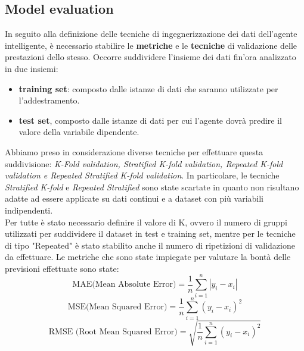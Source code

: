 \subsection{Model evaluation}
\fancyhead{}    %
\label{paragrafo 4.1}
In seguito alla definizione delle tecniche di ingegnerizzazione dei dati dell’agente intelligente, è necessario stabilire le \textbf{metriche} e le \textbf{tecniche} di validazione delle prestazioni dello
stesso. Occorre suddividere l’insieme dei dati fin’ora analizzato in due insiemi: 
\begin{itemize}
\item \textbf{training set}:
composto dalle istanze di dati che saranno utilizzate per l’addestramento.
\item \textbf{test set}, composto dalle istanze di dati per cui l’agente dovrà predire il valore della variabile dipendente.
\end{itemize}
Abbiamo preso in considerazione diverse tecniche per effettuare questa suddivisione: \textit{K-Fold
validation, Stratified K-fold validation, Repeated K-fold validation e Repeated Stratified
K-fold validation}. In particolare, le tecniche \textit{Stratified K-fold} e \textit{Repeated Stratified} sono state
scartate in quanto non risultano adatte ad essere applicate su dati continui e a dataset con più
variabili indipendenti. \\ 
Per tutte è stato necessario definire il valore di K, ovvero il numero
di gruppi utilizzati per suddividere il dataset in test e training set, mentre per le tecniche di tipo "Repeated" è stato stabilito anche il numero di
ripetizioni di validazione da effettuare. Le metriche che sono state impiegate per valutare la bontà delle
previsioni effettuate sono state: \\
\begin{equation}
\text{MAE(Mean Absolute Error)} = \frac{1}{n} \sum_{i=1}^{n} \left| y_i - x_i \right|
\end{equation}
\vspace{1ex}
\begin{equation}
\text{MSE(Mean Squared Error)} = \frac{1}{n} \sum_{i=1}^{n} (y_i - x_i)^2
\end{equation}
\vspace{1ex}
\begin{equation}
\text{RMSE (Root Mean Squared Error)} = \sqrt{\frac{1}{n} \sum_{i=1}^{n} (y_i - x_i)^2}
\end{equation}
